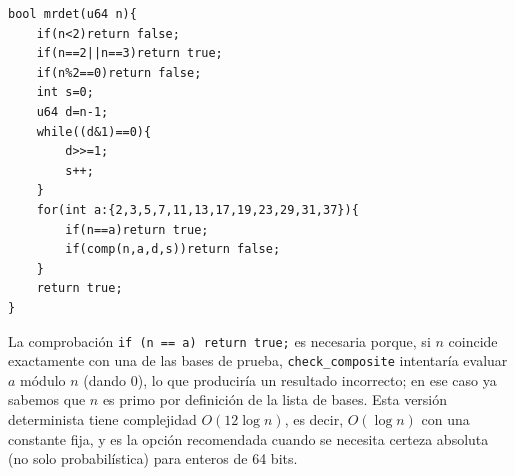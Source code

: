 \documentclass[11pt,a4paper]{article}
\begin{document}
\begin{lstlisting}
bool mrdet(u64 n){
    if(n<2)return false;
    if(n==2||n==3)return true;
    if(n%2==0)return false;
    int s=0;
    u64 d=n-1;
    while((d&1)==0){
        d>>=1;
        s++;
    }
    for(int a:{2,3,5,7,11,13,17,19,23,29,31,37}){
        if(n==a)return true;
        if(comp(n,a,d,s))return false;
    }
    return true;
}
\end{lstlisting}
La comprobación \texttt{if (n == a) return true;} es necesaria porque, si $n$ coincide exactamente con una de las bases de prueba, \texttt{check\_composite} intentaría evaluar $a$ módulo $n$ (dando 0), lo que produciría un resultado incorrecto; en ese caso ya sabemos que $n$ es primo por definición de la lista de bases. Esta versión determinista tiene complejidad $O(12 \log n)$, es decir, $O(\log n)$ con una constante fija, y es la opción recomendada cuando se necesita certeza absoluta (no solo probabilística) para enteros de 64 bits.
\end{document}
